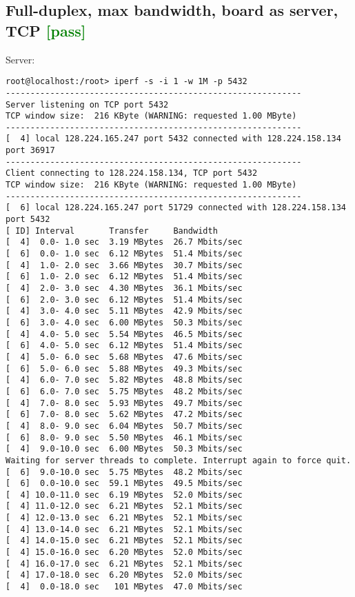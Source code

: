 \documentclass[a4paper]{report}
\begin{document}
\subsection{Full-duplex, max bandwidth, board as server, TCP \textcolor{green}{[pass]}}
Server:
\begin{lstlisting}
root@localhost:/root> iperf -s -i 1 -w 1M -p 5432   
------------------------------------------------------------
Server listening on TCP port 5432
TCP window size:  216 KByte (WARNING: requested 1.00 MByte)
------------------------------------------------------------
[  4] local 128.224.165.247 port 5432 connected with 128.224.158.134 port 36917
------------------------------------------------------------
Client connecting to 128.224.158.134, TCP port 5432
TCP window size:  216 KByte (WARNING: requested 1.00 MByte)
------------------------------------------------------------
[  6] local 128.224.165.247 port 51729 connected with 128.224.158.134 port 5432
[ ID] Interval       Transfer     Bandwidth
[  4]  0.0- 1.0 sec  3.19 MBytes  26.7 Mbits/sec
[  6]  0.0- 1.0 sec  6.12 MBytes  51.4 Mbits/sec
[  4]  1.0- 2.0 sec  3.66 MBytes  30.7 Mbits/sec
[  6]  1.0- 2.0 sec  6.12 MBytes  51.4 Mbits/sec
[  4]  2.0- 3.0 sec  4.30 MBytes  36.1 Mbits/sec
[  6]  2.0- 3.0 sec  6.12 MBytes  51.4 Mbits/sec
[  4]  3.0- 4.0 sec  5.11 MBytes  42.9 Mbits/sec
[  6]  3.0- 4.0 sec  6.00 MBytes  50.3 Mbits/sec
[  4]  4.0- 5.0 sec  5.54 MBytes  46.5 Mbits/sec
[  6]  4.0- 5.0 sec  6.12 MBytes  51.4 Mbits/sec
[  4]  5.0- 6.0 sec  5.68 MBytes  47.6 Mbits/sec
[  6]  5.0- 6.0 sec  5.88 MBytes  49.3 Mbits/sec
[  4]  6.0- 7.0 sec  5.82 MBytes  48.8 Mbits/sec
[  6]  6.0- 7.0 sec  5.75 MBytes  48.2 Mbits/sec
[  4]  7.0- 8.0 sec  5.93 MBytes  49.7 Mbits/sec
[  6]  7.0- 8.0 sec  5.62 MBytes  47.2 Mbits/sec
[  4]  8.0- 9.0 sec  6.04 MBytes  50.7 Mbits/sec
[  6]  8.0- 9.0 sec  5.50 MBytes  46.1 Mbits/sec
[  4]  9.0-10.0 sec  6.00 MBytes  50.3 Mbits/sec
Waiting for server threads to complete. Interrupt again to force quit.
[  6]  9.0-10.0 sec  5.75 MBytes  48.2 Mbits/sec
[  6]  0.0-10.0 sec  59.1 MBytes  49.5 Mbits/sec
[  4] 10.0-11.0 sec  6.19 MBytes  52.0 Mbits/sec
[  4] 11.0-12.0 sec  6.21 MBytes  52.1 Mbits/sec
[  4] 12.0-13.0 sec  6.21 MBytes  52.1 Mbits/sec
[  4] 13.0-14.0 sec  6.21 MBytes  52.1 Mbits/sec
[  4] 14.0-15.0 sec  6.21 MBytes  52.1 Mbits/sec
[  4] 15.0-16.0 sec  6.20 MBytes  52.0 Mbits/sec
[  4] 16.0-17.0 sec  6.21 MBytes  52.1 Mbits/sec
[  4] 17.0-18.0 sec  6.20 MBytes  52.0 Mbits/sec
[  4]  0.0-18.0 sec   101 MBytes  47.0 Mbits/sec
\end{lstlisting}
\end{document}
